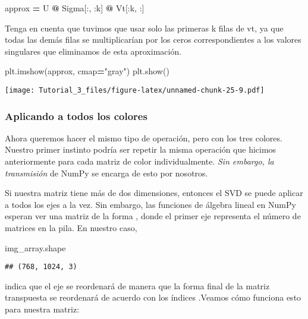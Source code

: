 \documentclass[
]{article}
\newenvironment{Shaded}{\begin{snugshade}}{\end{snugshade}}
\newcommand{\NormalTok}[1]{#1}
\newcommand{\OperatorTok}[1]{\textcolor[rgb]{0.81,0.36,0.00}{\textbf{#1}}}
\newcommand{\StringTok}[1]{\textcolor[rgb]{0.31,0.60,0.02}{#1}}
\begin{document}
\begin{Shaded}
\begin{Highlighting}[]
\NormalTok{approx }\OperatorTok{=}\NormalTok{ U }\OperatorTok{@}\NormalTok{ Sigma[:, :k] }\OperatorTok{@}\NormalTok{ Vt[:k, :]}
\end{Highlighting}
\end{Shaded}

Tenga en cuenta que tuvimos que usar solo las primeras k filas de vt, ya
que todas las demás filas se multiplicarían por los ceros
correspondientes a los valores singulares que eliminamos de esta
aproximación.

\begin{Shaded}
\begin{Highlighting}[]
\NormalTok{plt.imshow(approx, cmap}\OperatorTok{=}\StringTok{"gray"}\NormalTok{)}
\NormalTok{plt.show()}
\end{Highlighting}
\end{Shaded}

\texttt{[image: Tutorial\_3\_files/figure-latex/unnamed-chunk-25-9.pdf]}

\hypertarget{aplicando-a-todos-los-colores}{%
\subsubsection{Aplicando a todos los
colores}\label{aplicando-a-todos-los-colores}}

Ahora queremos hacer el mismo tipo de operación, pero con los tres
colores. Nuestro primer instinto podría ser repetir la misma operación
que hicimos anteriormente para cada matriz de color individualmente.
\emph{Sin embargo, la transmisión} de NumPy se encarga de esto por
nosotros.

Si nuestra matriz tiene más de dos dimensiones, entonces el SVD se puede
aplicar a todos los ejes a la vez. Sin embargo, las funciones de álgebra
lineal en NumPy esperan ver una matriz de la forma , donde el primer eje
representa el número de matrices en la pila. En nuestro caso,

\begin{Shaded}
\begin{Highlighting}[]
\NormalTok{img\_array.shape}
\end{Highlighting}
\end{Shaded}

\begin{verbatim}
## (768, 1024, 3)
\end{verbatim}

indica que el eje se reordenará de manera que la forma final de la
matriz transpuesta se reordenará de acuerdo con los índices .Veamos cómo
funciona esto para nuestra matriz:
\end{document}
